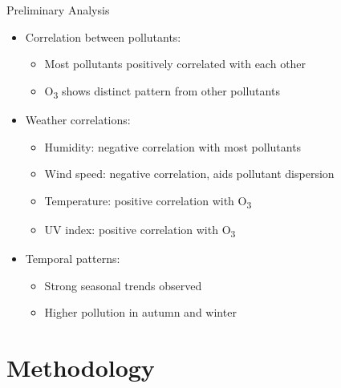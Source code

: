 \documentclass[svgnames, 10pt]{beamer}
\begin{document}
\begin{frame}{Preliminary Analysis}
    \begin{itemize}
       \item Correlation between pollutants:
           \begin{itemize}
               \item Most pollutants positively correlated with each other
               \item O\textsubscript{3} shows distinct pattern from other pollutants
           \end{itemize}
       \item Weather correlations:
           \begin{itemize}
               \item Humidity: negative correlation with most pollutants
               \item Wind speed: negative correlation, aids pollutant dispersion
               \item Temperature: positive correlation with O\textsubscript{3}
               \item UV index: positive correlation with O\textsubscript{3}
           \end{itemize}
       \item Temporal patterns:
           \begin{itemize}
               \item Strong seasonal trends observed
               \item Higher pollution in autumn and winter
           \end{itemize}
    \end{itemize}
\end{frame}

\section{Methodology}
\end{document}
